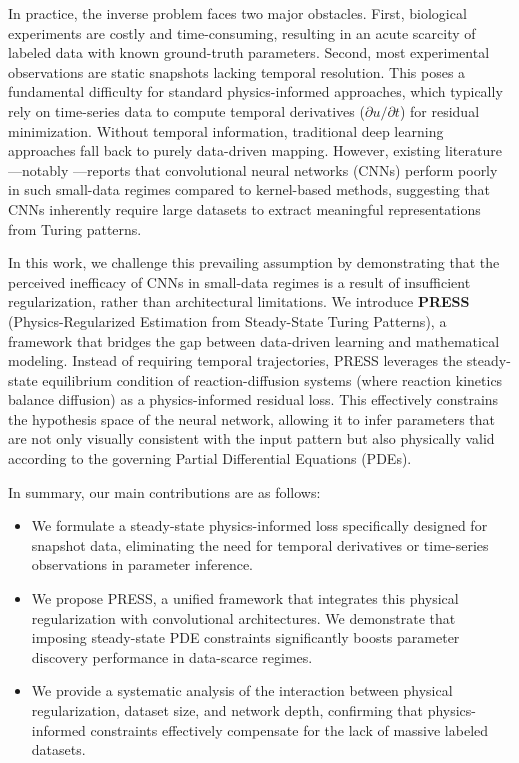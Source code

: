 \documentclass{article} %
\begin{document}
In practice, the inverse problem faces two major obstacles. First, biological experiments are costly and time-consuming, resulting in an acute scarcity of labeled data with known ground-truth parameters. Second, most experimental observations are static snapshots lacking temporal resolution. This poses a fundamental difficulty for standard physics-informed approaches, which typically rely on time-series data to compute temporal derivatives ($\partial u / \partial t$) for residual minimization. Without temporal information, traditional deep learning approaches fall back to purely data-driven mapping. However, existing literature---notably \cite{schnorr2023learning}---reports that convolutional neural networks (CNNs) perform poorly in such small-data regimes compared to kernel-based methods, suggesting that CNNs inherently require large datasets to extract meaningful representations from Turing patterns.

In this work, we challenge this prevailing assumption by demonstrating that the perceived inefficacy of CNNs in small-data regimes is a result of insufficient regularization, rather than architectural limitations. We introduce \textbf{PRESS} (Physics-Regularized Estimation from Steady-State Turing Patterns), a framework that bridges the gap between data-driven learning and mathematical modeling. Instead of requiring temporal trajectories, PRESS leverages the steady-state equilibrium condition of reaction-diffusion systems (where reaction kinetics balance diffusion) as a physics-informed residual loss. This effectively constrains the hypothesis space of the neural network, allowing it to infer parameters that are not only visually consistent with the input pattern but also physically valid according to the governing Partial Differential Equations (PDEs).

In summary, our main contributions are as follows:

\begin{itemize}

\item We formulate a steady-state physics-informed loss specifically designed for snapshot data, eliminating the need for temporal derivatives or time-series observations in parameter inference.

\item We propose PRESS, a unified framework that integrates this physical regularization with convolutional architectures. We demonstrate that imposing steady-state PDE constraints significantly boosts parameter discovery performance in data-scarce regimes.

\item We provide a systematic analysis of the interaction between physical regularization, dataset size, and network depth, confirming that physics-informed constraints effectively compensate for the lack of massive labeled datasets.

\end{itemize}
\end{document}
